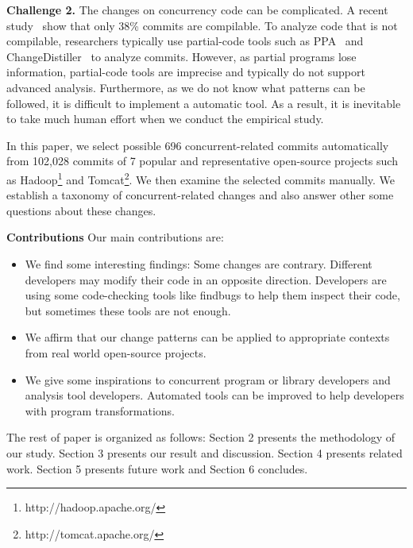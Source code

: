 \noindent
\textbf{Challenge 2.} The changes on concurrency code can be complicated. A recent study~\cite{tufano2016there} show that only 38\% commits are compilable. To analyze code that is not compilable, researchers typically use partial-code tools such as PPA~\cite{DagenaisH08ppa} and ChangeDistiller~\cite{fluri2007change} to analyze commits. However, as partial programs lose information, partial-code tools are imprecise and typically do not support advanced analysis. Furthermore, as we do not know what patterns can be followed, it is difficult to implement a automatic tool. As a result, it is inevitable to take much human effort when we conduct the empirical study.

In this paper, we select possible 696 concurrent-related commits automatically from 102,028 commits of 7 popular and representative open-source projects such as Hadoop\footnote{http://hadoop.apache.org/} and Tomcat\footnote{http://tomcat.apache.org/}. We then examine the selected commits manually. We establish a taxonomy of concurrent-related changes and also answer other some questions about these changes.

\textbf{Contributions} Our main contributions are:

\begin{itemize}
	\item We find some interesting findings: Some changes are contrary. Different developers may modify their code in an opposite direction. Developers are using some code-checking tools like findbugs to help them inspect their code, but sometimes these tools are not enough.
	\item We affirm that our change patterns can be applied to appropriate  contexts from real world open-source projects.
	\item We give some inspirations to concurrent program or library developers and analysis tool developers. Automated tools can be improved to help developers with program transformations.
\end{itemize}

The rest of paper is organized as follows: Section 2 presents the methodology of our study. Section 3 presents our result and discussion. Section 4 presents related work. Section 5 presents future work and Section 6 concludes.
